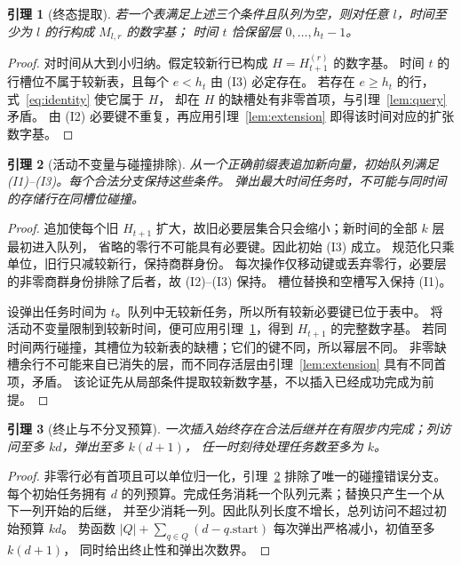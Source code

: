 \documentclass[11pt,a4paper,fontset=fandol]{ctexart}
\theoremstyle{definition}
\theoremstyle{plain}
\newtheorem{lemma}{引理}
\begin{document}
\begin{lemma}[终态提取]\label{lem:terminal}
若一个表满足上述三个条件且队列为空，则对任意 $l$，时间至少为 $l$ 的行构成 $M_{l,r}$ 的数字基；
时间 $t$ 恰保留层 $0,\ldots,h_t-1$。
\end{lemma}
\begin{proof}
对时间从大到小归纳。假定较新行已构成 $H=H_{t+1}^{(r)}$ 的数字基。
时间 $t$ 的行槽位不属于较新表，且每个 $e<h_t$ 由 (I3) 必定存在。
若存在 $e\ge h_t$ 的行，式~\eqref{eq:identity} 使它属于 $H$，
却在 $H$ 的缺槽处有非零首项，与引理~\ref{lem:query} 矛盾。
由 (I2) 必要键不重复，再应用引理~\ref{lem:extension} 即得该时间对应的扩张数字基。
\end{proof}

\begin{lemma}[活动不变量与碰撞排除]\label{lem:operational}
从一个正确前缀表追加新向量，初始队列满足 (I1)--(I3)。每个合法分支保持这些条件。
弹出最大时间任务时，不可能与同时间的存储行在同槽位碰撞。
\end{lemma}
\begin{proof}
追加使每个旧 $H_{t+1}$ 扩大，故旧必要层集合只会缩小；新时间的全部 $k$ 层最初进入队列，
省略的零行不可能具有必要键。因此初始 (I3) 成立。
规范化只乘单位，旧行只减较新行，保持商群身份。
每次操作仅移动键或丢弃零行，必要层的非零商群身份排除了后者，故 (I2)--(I3) 保持。
槽位替换和空槽写入保持 (I1)。

设弹出任务时间为 $t$。队列中无较新任务，所以所有较新必要键已位于表中。
将活动不变量限制到较新时间，便可应用引理~\ref{lem:terminal}，得到 $H_{t+1}$ 的完整数字基。
若同时间两行碰撞，其槽位为较新表的缺槽；它们的键不同，所以幂层不同。
非零缺槽余行不可能来自已消失的层，而不同存活层由引理~\ref{lem:extension} 具有不同首项，矛盾。
该论证先从局部条件提取较新数字基，不以插入已经成功完成为前提。
\end{proof}

\begin{lemma}[终止与不分叉预算]\label{lem:budget}
一次插入始终存在合法后继并在有限步内完成；列访问至多 $kd$，弹出至多 $k(d+1)$，
任一时刻待处理任务数至多为 $k$。
\end{lemma}
\begin{proof}
非零行必有首项且可以单位归一化，引理~\ref{lem:operational} 排除了唯一的碰撞错误分支。
每个初始任务拥有 $d$ 的列预算。完成任务消耗一个队列元素；替换只产生一个从下一列开始的后继，
并至少消耗一列。因此队列长度不增长，总列访问不超过初始预算 $kd$。
势函数 $|Q|+\sum_{q\in Q}(d-q.\mathrm{start})$ 每次弹出严格减小，初值至多 $k(d+1)$，
同时给出终止性和弹出次数界。
\end{proof}
\end{document}
